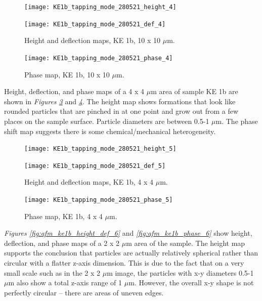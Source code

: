 \begin{figure}[H]
\centering
\begin{minipage}{.45\textwidth}
  \centering
  \texttt{[image: KE1b\_tapping\_mode\_280521\_height\_4]}
\end{minipage}
\begin{minipage}{.45\textwidth}
  \centering
  \texttt{[image: KE1b\_tapping\_mode\_280521\_def\_4]}
\end{minipage}
\caption[Height and deflection maps, KE 1b]{Height and deflection maps, KE 1b, 10 x 10 $\mu$m.}
\label{fig:afm_ke1b_height_def_3}
\end{figure}

\begin{figure}[H]
\centering
  \texttt{[image: KE1b\_tapping\_mode\_280521\_phase\_4]}
\caption[Phase map, KE 1b]{Phase map, KE 1b, 10 x 10 $\mu$m.}
\label{fig:afm_ke1b_phase_3}
\end{figure}

Height, deflection, and phase maps of a 4 x 4 $\mu$m area of sample KE 1b are shown in \textit{Figures \ref{fig:afm_ke1b_height_def_4}} and \textit{\ref{fig:afm_ke1b_phase_4}}. The height map shows formations that look like rounded particles that are pinched in at one point and grow out from a few places on the sample surface. Particle diameters are between 0.5-1 $\mu$m. The phase shift map suggests there is some chemical/mechanical heterogeneity.

\begin{figure}[H]
\centering
\begin{minipage}{.45\textwidth}
  \centering
  \texttt{[image: KE1b\_tapping\_mode\_280521\_height\_5]}
\end{minipage}
\begin{minipage}{.45\textwidth}
  \centering
  \texttt{[image: KE1b\_tapping\_mode\_280521\_def\_5]}
\end{minipage}
\caption[Height and deflection maps, KE 1b]{Height and deflection maps, KE 1b, 4 x 4 $\mu$m.}
\label{fig:afm_ke1b_height_def_4}
\end{figure}

\begin{figure}[H]
\centering
  \texttt{[image: KE1b\_tapping\_mode\_280521\_phase\_5]}
\caption[Phase map, KE 1b]{Phase map, KE 1b, 4 x 4 $\mu$m.}
\label{fig:afm_ke1b_phase_4}
\end{figure}

\textit{Figures \ref{fig:afm_ke1b_height_def_6}} and \textit{\ref{fig:afm_ke1b_phase_6}} show height, deflection, and phase maps of a 2 x 2 $\mu$m area of the sample. The height map supports the conclusion that particles are actually relatively spherical rather than circular with a flatter z-axis dimension. This is due to the fact that on a very small scale such as in the 2 x 2 $\mu$m image, the particles with x-y diameters 0.5-1 $\mu$m also show a total z-axis range of 1 $\mu$m. However, the overall x-y shape is not perfectly circular – there are areas of uneven edges. 

